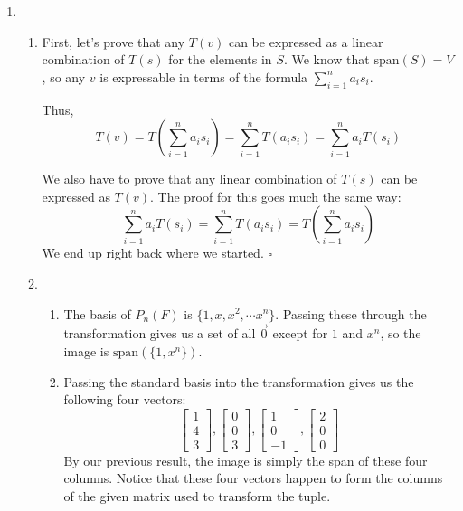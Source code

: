 \documentclass[12pt]{article}
\begin{document}
\begin{enumerate}
    \item \begin{enumerate}
              \item First, let's prove that any $T(v)$ can be expressed as a linear combination of $T(s)$ for the elements in $S$.
                    We know that $\text{span}(S)=V$, so any $v$ is expressable in terms of the formula $\sum_{i=1}^n a_i s_i$.

                    Thus, \[T(v)=T\left(\sum_{i=1}^n a_i s_i\right)=\sum_{i=1}^n T(a_i s_i)=\sum_{i=1}^n a_i T(s_i)\]

                    We also have to prove that any linear combination of $T(s)$ can be expressed as $T(v)$.
                    The proof for this goes much the same way:
                    \[\sum_{i=1}^n a_i T(s_i)=\sum_{i=1}^n T(a_i s_i)=T\left(\sum_{i=1}^n a_i s_i\right)\]
                    We end up right back where we started. $\square$
              \item \begin{enumerate}
                        \item The basis of $P_n(F)$ is $\{1, x, x^2, \cdots x^n\}$.
                              Passing these through the transformation gives us a set of all $\vec{0}$ except for $1$ and $x^n$,
                              so the image is $\boxed{\text{span}(\{1, x^n\})}$.

                        \item Passing the standard basis into the transformation gives us the following four vectors:
                              \[\begin{bmatrix}
                                      1 \\ 4 \\ 3
                                  \end{bmatrix}, \begin{bmatrix}
                                      0 \\ 0 \\ 3
                                  \end{bmatrix}, \begin{bmatrix}
                                      1 \\ 0 \\ -1
                                  \end{bmatrix}, \begin{bmatrix}
                                      2 \\ 0 \\ 0
                                  \end{bmatrix}\]
                              By our previous result, the image is simply the span of these four columns.
                              Notice that these four vectors happen to form the columns of the given matrix used to transform the tuple.


\end{enumerate}
\end{enumerate}
\end{enumerate}
\end{document}
